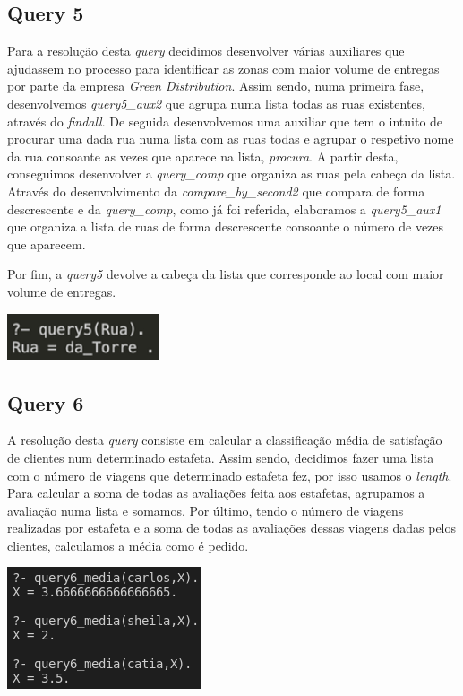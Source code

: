 \documentclass[a4paper,12pt]{article}
\begin{document}
    \subsection{Query 5}
        Para a resolução desta \emph{query} decidimos desenvolver várias auxiliares que ajudassem no processo para identificar as zonas com maior volume de entregas por parte da empresa \emph{Green Distribution}. Assim sendo, numa primeira fase, desenvolvemos \emph{query5\_aux2} que agrupa numa lista todas as ruas existentes, através do \emph{findall}. De seguida desenvolvemos uma auxiliar que tem o intuito de procurar uma dada rua numa lista com as ruas todas e agrupar o respetivo nome da rua consoante as vezes que aparece na lista, \emph{procura}. A partir desta, conseguimos desenvolver a \emph{query\_comp} que organiza as ruas pela cabeça da lista. Através do desenvolvimento da \emph{compare\_by\_second2} que compara de forma descrescente e da \emph{query\_comp}, como já foi referida, elaboramos a \emph{query5\_aux1} que organiza a lista de ruas de forma descrescente consoante o número de vezes que aparecem.\par
        Por fim, a \emph{query5} devolve a cabeça da lista que corresponde ao local com maior volume de entregas.
        
        \begin{center}
            \includegraphics[scale=0.9]{imagens/query5.png}
        \end{center}
        
    \subsection{Query 6}
        A resolução desta \emph{query} consiste em calcular a classificação média de satisfação de clientes num determinado estafeta. Assim sendo, decidimos fazer uma lista com o número de viagens que determinado estafeta fez, por isso usamos o \emph{length}. Para calcular a soma de todas as avaliações feita aos estafetas, agrupamos a avaliação numa lista e somamos. Por último, tendo o número de viagens realizadas por estafeta e a soma de todas as avaliações dessas viagens dadas pelos clientes, calculamos a média como é pedido.\par
    
        \begin{center}
            \includegraphics[scale=0.8]{imagens/query6.png}
        \end{center} 
    
\end{document}
